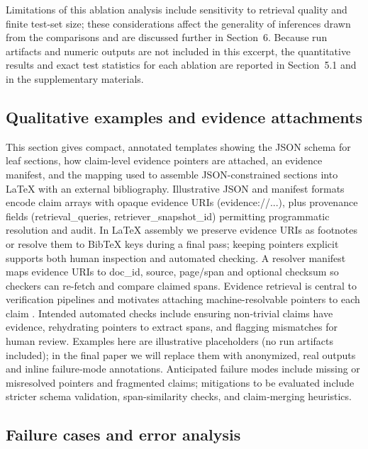 \documentclass{article}%
\begin{document}
Limitations of this ablation analysis include sensitivity to retrieval quality and finite test-set size; these considerations affect the generality of inferences drawn from the comparisons and are discussed further in Section~6. Because run artifacts and numeric outputs are not included in this excerpt, the quantitative results and exact test statistics for each ablation are reported in Section~5.1 and in the supplementary materials.%

%
\subsection{Qualitative examples and evidence attachments}%


%
This section gives compact, annotated templates showing the JSON schema for leaf sections, how claim-level evidence pointers are attached, an evidence manifest, and the mapping used to assemble JSON-constrained sections into LaTeX with an external bibliography.  
Illustrative JSON and manifest formats encode claim arrays with opaque evidence URIs (evidence://...), plus provenance fields (retrieval_queries, retriever_snapshot_id) permitting programmatic resolution and audit.  
In LaTeX assembly we preserve evidence URIs as footnotes or resolve them to BibTeX keys during a final pass; keeping pointers explicit supports both human inspection and automated checking.  
A resolver manifest maps evidence URIs to doc_id, source, page/span and optional checksum so checkers can re-fetch and compare claimed spans.  
Evidence retrieval is central to verification pipelines and motivates attaching machine-resolvable pointers to each claim \cite{web_chen_2023_complex_claim_verification_with_evidence_retriev}.  
Intended automated checks include ensuring non‑trivial claims have evidence, rehydrating pointers to extract spans, and flagging mismatches for human review.  
Examples here are illustrative placeholders (no run artifacts included); in the final paper we will replace them with anonymized, real outputs and inline failure‑mode annotations.  
Anticipated failure modes include missing or misresolved pointers and fragmented claims; mitigations to be evaluated include stricter schema validation, span-similarity checks, and claim‑merging heuristics.%

%
\subsection{Failure cases and error analysis}%
\end{document}
